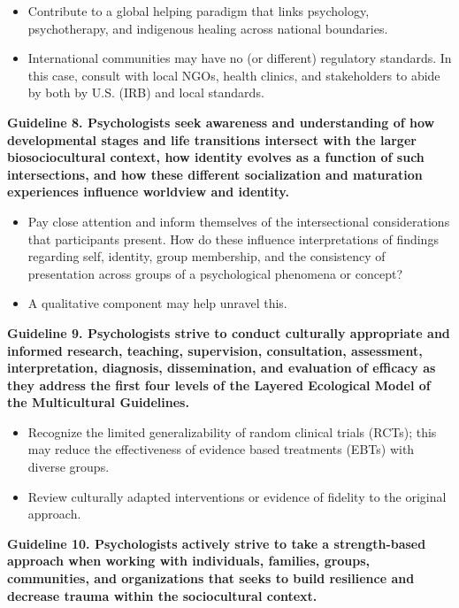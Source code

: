 \documentclass[
  english,
]{book}
\providecommand{\tightlist}{%
  \setlength{\itemsep}{0pt}\setlength{\parskip}{0pt}}
\begin{document}
\begin{itemize}
\tightlist
\item
  Contribute to a global helping paradigm that links psychology, psychotherapy, and indigenous healing across national boundaries.
\item
  International communities may have no (or different) regulatory standards. In this case, consult with local NGOs, health clinics, and stakeholders to abide by both by U.S. (IRB) and local standards.
\end{itemize}

\textbf{Guideline 8. Psychologists seek awareness and understanding of how developmental stages and life transitions intersect with the larger biosociocultural context, how identity evolves as a function of such intersections, and how these different socialization and maturation experiences influence worldview and identity.}

\begin{itemize}
\tightlist
\item
  Pay close attention and inform themselves of the intersectional considerations that participants present. How do these influence interpretations of findings regarding self, identity, group membership, and the consistency of presentation across groups of a psychological phenomena or concept?
\item
  A qualitative component may help unravel this.
\end{itemize}

\textbf{Guideline 9. Psychologists strive to conduct culturally appropriate and informed research, teaching, supervision, consultation, assessment, interpretation, diagnosis, dissemination, and evaluation of efficacy as they address the first four levels of the Layered Ecological Model of the Multicultural Guidelines.}

\begin{itemize}
\tightlist
\item
  Recognize the limited generalizability of random clinical trials (RCTs); this may reduce the effectiveness of evidence based treatments (EBTs) with diverse groups.
\item
  Review culturally adapted interventions or evidence of fidelity to the original approach.
\end{itemize}

\textbf{Guideline 10. Psychologists actively strive to take a strength-based approach when working with individuals, families, groups, communities, and organizations that seeks to build resilience and decrease trauma within the sociocultural context.}
\end{document}
